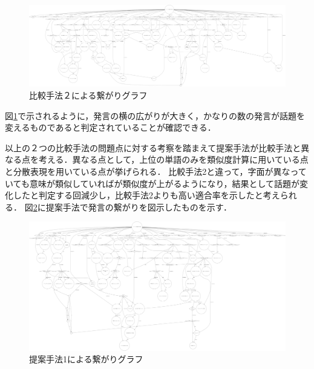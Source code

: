 \begin{figure}[htbp]
 \begin{center}
  \includegraphics[width=\textwidth]{../images/5.Experiment/Graph=TF-IDF-min.png}
  \caption{比較手法２による繋がりグラフ}
  \label{Fig:GraphTF-IDF}
  \vspace{-10pt}
 \end{center}
\end{figure}
図\ref{Fig:GraphTF-IDF}で示されるように，発言の横の広がりが大きく，かなりの数の発言が話題を変えるものであると判定されていることが確認できる．

以上の２つの比較手法の問題点に対する考察を踏まえて提案手法が比較手法と異なる点を考える．異なる点として，上位の単語のみを類似度計算に用いている点と分散表現を用いている点が挙げられる．
比較手法2と違って，字面が異なっていても意味が類似していればが類似度が上がるようになり，結果として話題が変化したと判定する回減少し，比較手法2よりも高い適合率を示したと考えられる．
図\ref{Fig:GraphFastText}に提案手法で発言の繋がりを図示したものを示す．

\begin{figure}[htbp]
 \begin{center}
  \includegraphics[width=\textwidth]{../images/5.Experiment/Graph=FastText-min.png}
  \caption{提案手法1による繋がりグラフ}
  \label{Fig:GraphFastText}
  \vspace{-10pt}
 \end{center}
\end{figure}

